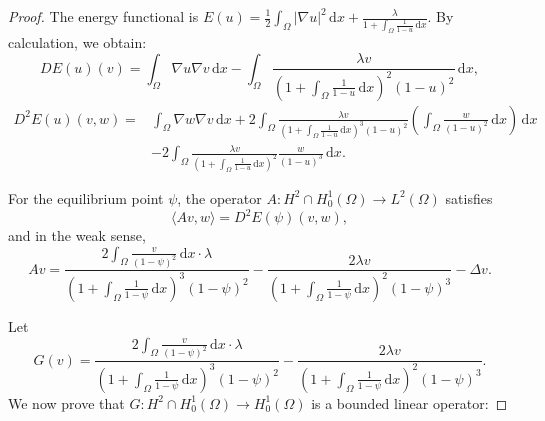 \documentclass{article}
\numberwithin{equation}{section}
\begin{document}
\begin{proof}
    The energy functional is $E(u)=\frac{1}{2}\int_{\Omega}|\nabla u|^2\,\mathrm{d}x+\frac{\lambda}{1+\int_{\Omega}\frac{1}{1-u}\,\mathrm{d}x}$.
    By calculation, we obtain:
    \begin{equation}
        DE(u)(v)=\int_{\Omega}\nabla u\nabla v\,\mathrm{d}x-\int_{\Omega}\frac{\lambda v}{(1+\int_{\Omega}\frac{1}{1-u}\,\mathrm{d}x)^2(1-u)^2}\,\mathrm{d}x,\label{2.10}
    \end{equation}
    \begin{align*}
        D^2E(u)(v,w)=&\int_{\Omega}\nabla w\nabla v\,\mathrm{d}x+2\int_{\Omega}\frac{\lambda v}{(1+\int_{\Omega}\frac{1}{1-u}\,\mathrm{d}x)^3(1-u)^2}\left(\int_{\Omega}\frac{w}{(1-u)^2}\,\mathrm{d}x\right)\,\mathrm{d}x\\
        &-2\int_{\Omega}\frac{\lambda v}{(1+\int_{\Omega}\frac{1}{1-u}\,\mathrm{d}x)^2}\frac{w}{(1-u)^3}\,\mathrm{d}x.
    \end{align*}

    For the equilibrium point $\psi$, the operator $A:H^2\cap H_0^1(\Omega)\to L^{2}(\Omega)$ satisfies
    $$\langle Av,w \rangle = D^2E(\psi)(v,w),$$
    and in the weak sense,
    $$Av=\frac{2\int_{\Omega}\frac{v}{(1-\psi)^2}\,\mathrm{d}x\cdot\lambda}{(1+\int_{\Omega}\frac{1}{1-\psi}\,\mathrm{d}x)^3(1-\psi)^2}-\frac{2\lambda v}{(1+\int_{\Omega}\frac{1}{1-\psi}\,\mathrm{d}x)^2(1-\psi)^3}-\Delta v.$$

    Let $$G(v)=\frac{2\int_{\Omega}\frac{v}{(1-\psi)^2}\,\mathrm{d}x\cdot\lambda}{(1+\int_{\Omega}\frac{1}{1-\psi}\,\mathrm{d}x)^3(1-\psi)^2}-\frac{2\lambda v}{(1+\int_{\Omega}\frac{1}{1-\psi}\,\mathrm{d}x)^2(1-\psi)^3}.$$
    We now prove that $G:H^2\cap H_0^1(\Omega)\to H_0^1(\Omega)$ is a bounded linear operator:


\end{proof}
\end{document}

